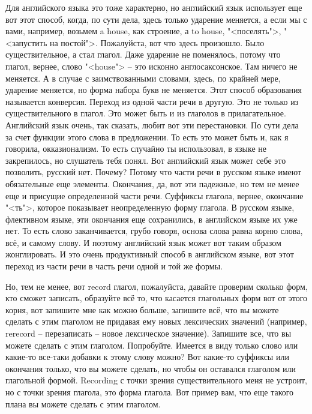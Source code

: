 \documentclass[main.tex]{subfiles}
\begin{document}
Для английского языка это тоже характерно, но английский язык использует еще вот этот способ, когда, по сути дела, здесь только ударение меняется, а если мы с вами, например, возьмем a house, как строение, а to house, "<поселять">, "<запустить на постой">.
Пожалуйста, вот что здесь произошло.
Было существительное, а стал глагол.
Даже ударение не поменялось, потому что глагол, вернее, слово "<house"> -- это исконно англосаксонское.
Там ничего не меняется.
А в случае с заимствованными словами, здесь, по крайней мере, ударение меняется, но форма набора букв не меняется.
Этот способ образования называется конверсия.
Переход из одной части речи в другую.
Это не только из существительного в глагол.
Это может быть и из глаголов в прилагательное.
Английский язык очень, так сказать, любит вот эти перестановки.
По сути дела за счет функции этого слова в предложении.
То есть это может быть и, как я говорила, окказионализм.
То есть случайно ты использовал, в языке не закрепилось, но слушатель тебя понял.
Вот английский язык может себе это позволить, русский нет.
Почему?
Потому что части речи в русском языке имеют обязательные еще элементы.
Окончания, да, вот эти падежные, но тем не менее еще и присущие определенной части речи.
Суффиксы глагола, вернее, окончание "<ть">, которое показывает неопределенную форму глагола.
В русском языке, флективном языке, эти окончания еще сохранились, в английском языке их уже нет.
То есть слово заканчивается, грубо говоря, основа слова равна корню слова, всё, и самому слову.
И поэтому английский язык может вот таким образом жонглировать.
И это очень продуктивный способ в английском языке, вот этот переход из части речи в часть речи одной и той же формы.

Но, тем не менее, вот record глагол, пожалуйста, давайте проверим сколько форм, кто сможет записать, образуйте всё то, что касается глагольных форм вот от этого корня, вот запишите мне как можно больше, запишите всё, что вы можете сделать с этим глаголом не придавая ему новых лексических значений (например, rerecord -- перезаписать -- новое лексическое значение).
Запишите все, что вы можете сделать с этим глаголом.
Попробуйте.
Имеется в виду только слово или какие-то все-таки добавки к этому слову можно?
Вот какие-то суффиксы или окончания только, что вы можете сделать, но чтобы он оставался глаголом или глагольной формой.
Recording с точки зрения существительного меня не устроит, но с точки зрения глагола, это форма глагола.
Вот пример вам, что еще такого плана вы можете сделать с этим глаголом.
\\
\end{document}

